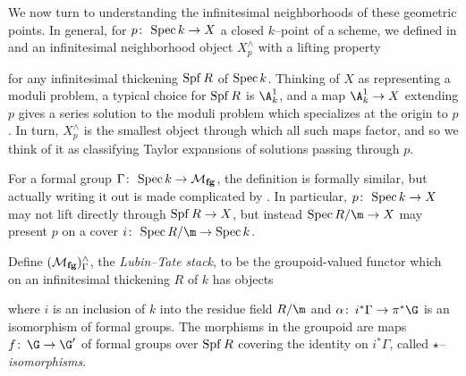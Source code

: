 We now turn to understanding the infinitesimal neighborhoods of these geometric points.  In general, for $p\colon\thinspace \operatorname{Spec} k \to X$ a closed $k$--point of a scheme, we defined in  and  an infinitesimal neighborhood object $X^\wedge_p$ with a lifting property
\begin{center}
\end{center}
for any infinitesimal thickening $\operatorname{Spf} R$ of $\operatorname{Spec} k$.  Thinking of $X$ as representing a moduli problem, a typical choice for $\operatorname{Spf} R$ is $\A^1_k$, and a map $\A^1_k \to X$ extending $p$ gives a series solution to the moduli problem which specializes at the origin to $p$.  In turn, $X^\wedge_p$ is the smallest object through which all such maps factor, and so we think of it as classifying Taylor expansions of solutions passing through $p$.

For a formal group $\Gamma\colon\thinspace \operatorname{Spec} k \to \mathcal{M}_{\mathbf{fg}}$, the definition is formally similar, but actually writing it out is made complicated by .  In particular, $p\colon\thinspace \operatorname{Spec} k \to X$ may not lift directly through $\operatorname{Spf} R \to X$, but instead $\Spec R/\m \to X$ may present $p$ on a cover $i\co \Spec R/\m \to \Spec k$.

\begin{definition}\label{LubinTateDefn}
Define $(\mathcal{M}_{\mathbf{fg}})^\wedge_\Gamma$, the \textit{Lubin--Tate stack}, to be the groupoid-valued functor which on an infinitesimal thickening $R$ of $k$ has objects
\begin{center}
\end{center}
where $i$ is an inclusion of $k$ into the residue field $R/\m$ and $\alpha\co i^* \Gamma \to \pi^* \G$ is an isomorphism of formal groups.  The morphisms in the groupoid are maps $f\co \G \to \G'$ of formal groups over $\operatorname{Spf} R$ covering the identity on $i^* \Gamma$, called \textit{$\star$--isomorphisms}.
\end{definition}

